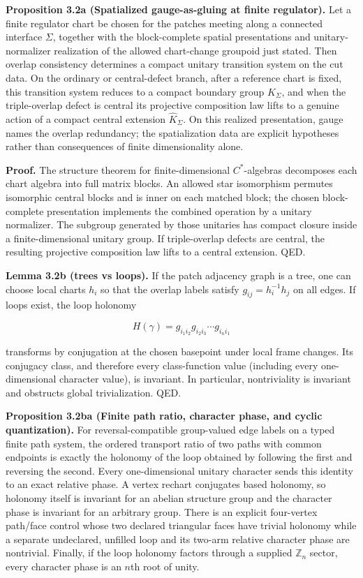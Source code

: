 \textbf{Proposition 3.2a (Spatialized gauge-as-gluing at finite regulator).} Let a finite regulator chart be chosen for the patches meeting along a connected interface \(\Sigma\), together with the block-complete spatial presentations and unitary-normalizer realization of the allowed chart-change groupoid just stated. Then overlap consistency determines a compact unitary transition system on the cut data. On the ordinary or central-defect branch, after a reference chart is fixed, this transition system reduces to a compact boundary group \(K_\Sigma\), and when the triple-overlap defect is central its projective composition law lifts to a genuine action of a compact central extension \(\widehat K_\Sigma\). On this realized presentation, gauge names the overlap redundancy; the spatialization data are explicit hypotheses rather than consequences of finite dimensionality alone.

\textbf{Proof.} The structure theorem for finite-dimensional \(C^*\)-algebras decomposes each chart algebra into full matrix blocks. An allowed star isomorphism permutes isomorphic central blocks and is inner on each matched block; the chosen block-complete presentation implements the combined operation by a unitary normalizer. The subgroup generated by those unitaries has compact closure inside a finite-dimensional unitary group. If triple-overlap defects are central, the resulting projective composition law lifts to a central extension. QED.

\textbf{Lemma 3.2b (trees vs loops).} If the patch adjacency graph is a tree, one can choose local charts \(h_i\) so that the overlap labels satisfy \(g_{ij} = h_i^{-1} h_j\) on all edges. If loops exist, the loop holonomy

\[
H(\gamma) = g_{i_1 i_2} g_{i_2 i_3} \cdots g_{i_n i_1}
\]

transforms by conjugation at the chosen basepoint under local frame changes.
Its conjugacy class, and therefore every class-function value (including every
one-dimensional character value), is invariant. In particular, nontriviality
is invariant and obstructs global trivialization. QED.

\textbf{Proposition 3.2ba (Finite path ratio, character phase, and cyclic
quantization).} For reversal-compatible group-valued edge labels on a typed
finite path system, the ordered transport ratio of two paths with common
endpoints is exactly the holonomy of the loop obtained by following the first
and reversing the second. Every one-dimensional unitary character sends this
identity to an exact relative phase. A vertex rechart conjugates based
holonomy, so holonomy itself is invariant for an abelian structure group and
the character phase is invariant for an arbitrary group. There is an explicit
four-vertex path/face control whose two declared triangular faces have trivial
holonomy while a separate undeclared, unfilled loop and its two-arm relative
character phase are nontrivial. Finally, if the loop holonomy factors through
a supplied \(\mathbb Z_n\) sector, every character phase is an \(n\)th root of unity.

